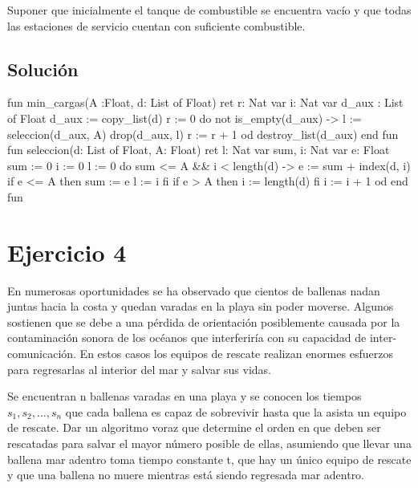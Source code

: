 \documentclass{article}
\begin{document}
Suponer que inicialmente el tanque de combustible se encuentra vacío y que todas las estaciones de servicio cuentan con suficiente combustible.
\subsection*{Solución}
\begin{codebox}
\begin{pascallike}
fun min_cargas(A :Float, d: List of Float) ret r: Nat
  var i: Nat
  var d_aux : List of Float
  d_aux := copy_list(d)
  r := 0
  do not is_empty(d_aux) ->
    l := seleccion(d_aux, A)
    drop(d_aux, l)
    r := r + 1
  od
  destroy_list(d_aux)
end fun
fun seleccion(d: List of Float, A: Float) ret l: Nat
  var sum, i: Nat
  var e: Float
  sum := 0
  i := 0
  l := 0
  do sum <= A && i < length(d) ->
    e := sum + index(d, i)
    if e <= A then
      sum := e
      l := i
    fi
    if e > A then
      i := length(d)
    fi
    i := i + 1
  od
end fun
\end{pascallike}
\end{codebox}

\newpage
\section*{Ejercicio 4}
En numerosas oportunidades se ha observado que cientos de ballenas nadan juntas hacia la costa y quedan varadas en la playa sin poder moverse. Algunos sostienen que se debe a una pérdida de orientación posiblemente causada por la contaminación sonora de los océanos que interferiría con su capacidad de inter-comunicación. En estos casos los equipos de rescate realizan enormes esfuerzos para regresarlas al interior del mar y salvar sus vidas.

Se encuentran n ballenas varadas en una playa y se conocen los tiempos $s_1, s_2, . . . , s_n$ que cada ballena es capaz de sobrevivir hasta que la asista un equipo de rescate. Dar un algoritmo voraz que determine el orden en que deben ser rescatadas para salvar el mayor número posible de ellas, asumiendo que llevar una ballena mar adentro toma tiempo constante t, que hay un único equipo de rescate y que una ballena no muere mientras está siendo regresada mar adentro.
\end{document}
